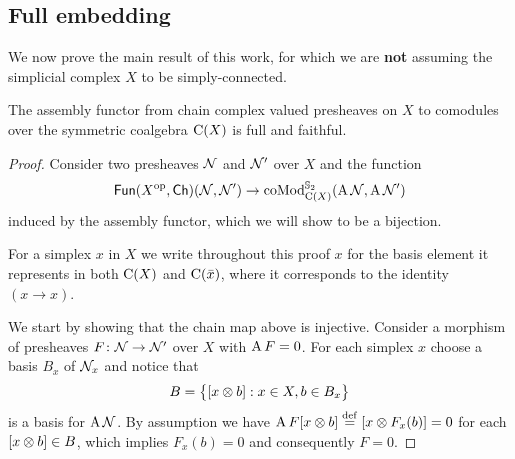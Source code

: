 
\subsection{Full embedding}\label{ss:full embedding}

We now prove the main result of this work, for which we are \textbf{not} assuming the simplicial complex $X$ to be simply-connected.

\begin{theorem*}
	The assembly functor from chain complex valued presheaves on $X$ to comodules over the symmetric coalgebra $\chains(X)$ is full and faithful.
\end{theorem*}

\begin{proof}
	Consider two presheaves $\cN$ and $\cN'$ over $X$ and the function
	\[
	\Fun(X^\op, \Ch)(\cN, \cN') \to \coMod^{\sym_2}_{\chains(X)}(\assembly \cN, \assembly \cN')
	\]
	induced by the assembly functor, which we will show to be a bijection.

	For a simplex $x$ in $X$ we write throughout this proof $x$ for the basis element it represents in both $\chains(X)$ and $\chains(\bar x)$, where it corresponds to the identity $(x \to x)$.

	We start by showing that the chain map above is injective.
	Consider a morphism of presheaves $F \colon \cN \to \cN'$ over $X$ with $\assembly F = 0$.
	For each simplex $x$ choose a basis $B_x$ of $\cN_x$ and notice that
	\[
	B = \set[\big]{[x \ot b] : x \in X, b \in B_x}
	\]
	is a basis for $\assembly \cN$.
	By assumption we have $\assembly F [x \ot b] \defeq [x \ot F_x(b)] = 0$ for each $[x \ot b] \in B$, which implies $F_x(b) = 0$ and consequently $F = 0$.


\end{proof}
